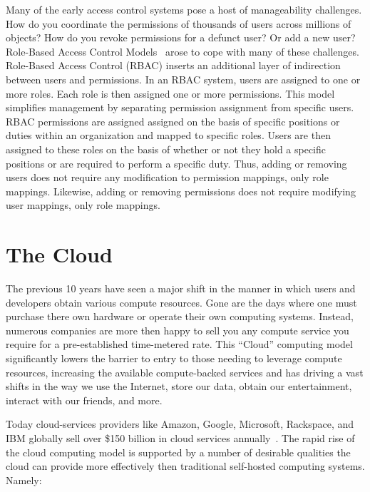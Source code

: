 Many of the early access control systems pose a host of manageability
challenges. How do you coordinate the permissions of thousands of
users across millions of objects? How do you revoke permissions for a
defunct user? Or add a new user?  Role-Based Access Control
Models~\cite{Sandhu1996} arose to cope with many of these challenges.
Role-Based Access Control (RBAC) inserts an additional layer of
indirection between users and permissions. In an RBAC system, users
are assigned to one or more roles. Each role is then assigned one or
more permissions. This model simplifies management by separating
permission assignment from specific users. RBAC permissions are
assigned assigned on the basis of specific positions or duties within
an organization and mapped to specific roles. Users are then assigned
to these roles on the basis of whether or not they hold a specific
positions or are required to perform a specific duty. Thus, adding or
removing users does not require any modification to permission
mappings, only role mappings. Likewise, adding or removing permissions
does not require modifying user mappings, only role
mappings.

\section{The Cloud}

The previous 10 years have seen a major shift in the manner in which
users and developers obtain various compute resources. Gone are the
days where one must purchase there own hardware or operate their own
computing systems. Instead, numerous companies are more then happy to
sell you any compute service you require for a pre-established
time-metered rate. This ``Cloud'' computing model significantly lowers
the barrier to entry to those needing to leverage compute resources,
increasing the available compute-backed services and has driving a
vast shifts in the way we use the Internet, store our data, obtain our
entertainment, interact with our friends, and more.

Today cloud-services providers like Amazon, Google, Microsoft,
Rackspace, and IBM globally sell over \$150 billion in cloud services
annually~\cite{Flood2013}. The rapid rise of the cloud computing model
is supported by a number of desirable qualities the cloud can provide
more effectively then traditional self-hosted computing
systems. Namely:

